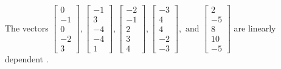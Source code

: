 \begin{exercise}
\begin{exerciseStatement}
  \end{exerciseStatement}
  \begin{exerciseAnswer}
   The vectors \(\left[\begin{array}{r}
0 \\
-1 \\
0 \\
-2 \\
3
\end{array}\right] , \left[\begin{array}{r}
-1 \\
3 \\
-4 \\
-4 \\
1
\end{array}\right] , \left[\begin{array}{r}
-2 \\
-1 \\
2 \\
3 \\
4
\end{array}\right] , \left[\begin{array}{r}
-3 \\
4 \\
4 \\
-2 \\
-3
\end{array}\right] , \text{ and } \left[\begin{array}{r}
2 \\
-5 \\
8 \\
10 \\
-5
\end{array}\right]\) are 
  	 linearly dependent  .
  


  \end{exerciseAnswer}
\end{exercise}